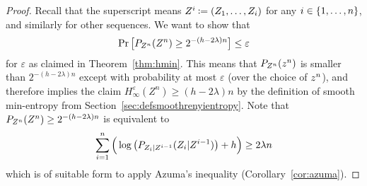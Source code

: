 \begin{proof}
Recall that the superscript means $\prei[i]{Z} \assign (Z_1,\ldots,Z_i)$ for any $i \in
\set{1,\ldots,n}$, and similarly for other sequences.  We want to show
that $$\Pr\big[P_{\prei[n]{Z}}(\prei[n]{Z}) \geq
  2^{-(h-2\lambda)n}\big] \leq \varepsilon$$ for $\varepsilon$ as
claimed in Theorem~\ref{thm:hmin}.  This means that
$P_{\prei[n]{Z}}(\prei[n]{z})$ is smaller than $2^{-(h-2\lambda)n}$
except with probability at most $\varepsilon$ (over the choice of
$\prei[n]{z}$), and therefore implies the claim
\mbox{$H_{\infty}^{\varepsilon}(Z^n) \geq (h-2\lambda)n$}
by the definition of smooth min-entropy from Section~\ref{sec:defsmoothrenyientropy}.
Note that
$P_{\prei[n]{Z}}(\prei[n]{Z}) \geq 2^{-(h-2\lambda)n}$ is equivalent to
\begin{equation}\label{eq:bound1}
  \sum_{i=1}^n \Big( \log\big( P_{Z_i | \prei{Z}}(Z_i | \prei{Z}) \big) + h \Big) \geq 2 \lambda n
\end{equation}
which is of suitable form to apply Azuma's
 inequality (Corollary~\ref{cor:azuma}). 


\end{proof}
